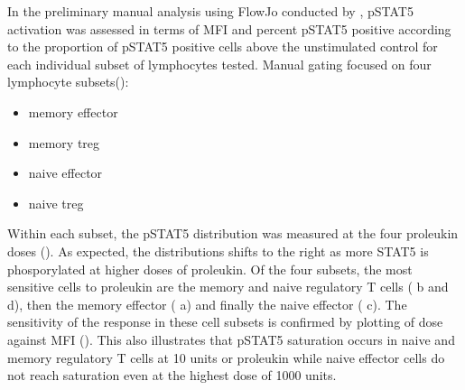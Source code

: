 In the preliminary manual analysis using FlowJo conducted by , pSTAT5 activation was assessed in terms of MFI and percent pSTAT5 positive according
to the proportion of pSTAT5 positive cells above the unstimulated control for each individual subset of lymphocytes tested.  
Manual gating focused on four lymphocyte subsets():
\begin{itemize}
  \item memory effector
  \item memory treg
  \item naive effector
  \item naive treg
\end{itemize}
Within each subset, the pSTAT5 distribution was measured at the four proleukin doses ().
As expected, the distributions shifts to the right as more STAT5 is phosporylated at higher doses of proleukin.
Of the four subsets, the most sensitive cells to proleukin are the memory and naive regulatory T cells ( b and d),
then the memory effector ( a) and finally the naive effector ( c).
The sensitivity of the response in these cell subsets is confirmed by plotting of dose against MFI ().
This also illustrates that pSTAT5 saturation occurs in naive and memory regulatory T cells at 10 units or proleukin while naive effector cells do not reach
saturation even at the highest dose of 1000 units.
 


%


